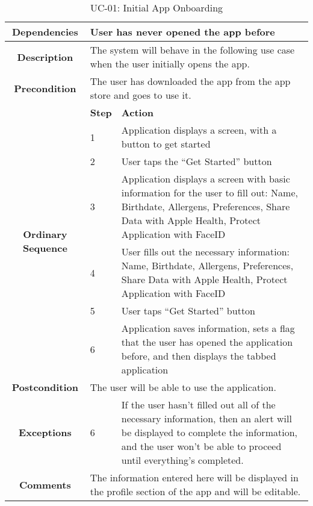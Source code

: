 \begin{table}[ht]
\centering
\caption{UC-01: Initial App Onboarding}

\renewcommand{\arraystretch}{1.5}
\begin{tabular}{|c|p{2em}|p{14cm}|}
\hline
\textbf{Dependencies} & \multicolumn{2}{|p{14cm}|}{User has never opened the app before} \\ 
\hline
\textbf{Description} & \multicolumn{2}{|p{14cm}|}{The system will behave in the following use case when the user initially opens the app.} \\
\hline
\textbf{Precondition} & \multicolumn{2}{|p{14cm}|}{The user has downloaded the app from the app store and goes to use it.} \\
\hline
\multirow{7}{4em}{\textbf{Ordinary Sequence}} & \textbf{Step} & \textbf{Action} \\
& 
1 & Application displays a screen, with a button to get started \\
& 2 & User taps the “Get Started” button \\
& 3 & Application displays a screen with basic information for the user to fill out: Name, Birthdate, Allergens, Preferences, Share Data with Apple Health, Protect Application with FaceID \\
& 4 & User fills out the necessary information: Name, Birthdate, Allergens, Preferences, Share Data with Apple Health, Protect Application with FaceID \\
& 5 & User taps “Get Started” button \\
& 6 & Application saves information, sets a flag that the user has opened the application before, and then displays the tabbed application \\
\hline
\textbf{Postcondition} & \multicolumn{2}{|p{14cm}|}{The user will be able to use the application.} \\
\hline
\textbf{Exceptions} & 6 & If the user hasn’t filled out all of the necessary information, then an alert will be displayed to complete the information, and the user won’t be able to proceed until everything’s completed. \\
\hline
\textbf{Comments} & \multicolumn{2}{|p{14cm}|}{The information entered here will be displayed in the profile section of the app and will be editable.} \\
\hline
\end{tabular}
\end{table}

